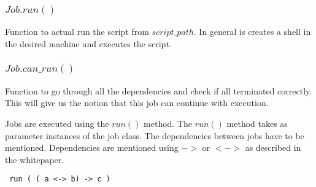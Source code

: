 \subsubsection*{$Job.run()$}
Function to actual run the script from $script\_path$. In general is creates a shell in the desired machine
and executes the script.
\subsubsection*{$Job.can\_run()$}
Function to go through all the dependencies and check if all terminated correctly. This will give us the notion
that this job can continue with execution.

Jobs are executed using the $run()$ method. The $run()$ method takes as parameter instances of the job class.
The dependencies between jobs have to be mentioned. Dependencies are mentioned using $->$ or $<->$ as described in the whitepaper.

\begin{verbatim}
 run ( ( a <-> b) -> c )
\end{verbatim}
